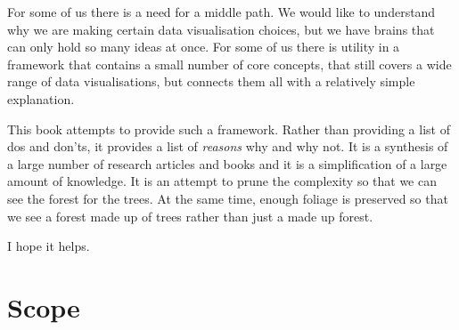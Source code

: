 \documentclass[
  letterpaper,
  DIV=11,
  numbers=noendperiod]{scrreprt}
\begin{document}
For some of us there is a need for a middle path. We would like to
understand why we are making certain data visualisation choices, but we
have brains that can only hold so many ideas at once. For some of us
there is utility in a framework that contains a small number of core
concepts, that still covers a wide range of data visualisations, but
connects them all with a relatively simple explanation.

This book attempts to provide such a framework. Rather than providing a
list of dos and don'ts, it provides a list of \emph{reasons} why and why
not. It is a synthesis of a large number of research articles and books
and it is a simplification of a large amount of knowledge. It is an
attempt to prune the complexity so that we can see the forest for the
trees. At the same time, enough foliage is preserved so that we see a
forest made up of trees rather than just a made up forest.

I hope it helps.

\section*{Scope}\label{sec-scope}

\end{document}
